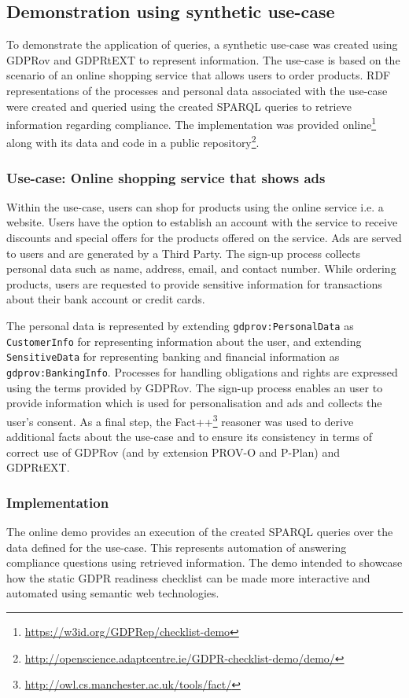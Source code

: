 \subsection{Demonstration using synthetic use-case} \label{sec:testing:sparql:demo}
To demonstrate the application of queries, a synthetic use-case was created using GDPRov and GDPRtEXT to represent information.
The use-case is based on the scenario of an online shopping service that allows users to order products.
RDF representations of the processes and personal data associated with the use-case were created and queried using the created SPARQL queries to retrieve information regarding compliance.
The implementation was provided online\footnote{\url{https://w3id.org/GDPRep/checklist-demo}} along with its data and code in a public repository\footnote{\url{http://openscience.adaptcentre.ie/GDPR-checklist-demo/demo/}}.

\subsubsection{Use-case: Online shopping service that shows ads}
Within the use-case, users can shop for products using the online service i.e. a website. Users have the option to establish an account with the service to receive discounts and special offers for the products offered on the service.
Ads are served to users and are generated by a Third Party.
The sign-up process collects personal data such as name, address, email, and contact number.
While ordering products, users are requested to provide sensitive information for transactions about their bank account or credit cards.

The personal data is represented by extending \texttt{gdprov:PersonalData} as \texttt{CustomerInfo} for representing information about the user, and extending \texttt{SensitiveData} for representing banking and financial information as \texttt{gdprov:BankingInfo}.
Processes for handling obligations and rights are expressed using the terms provided by GDPRov.
The sign-up process enables an user to provide information which is used for personalisation and ads and collects the user's consent.
As a final step, the Fact++\footnote{\url{http://owl.cs.manchester.ac.uk/tools/fact/}}
reasoner was used to derive additional facts about the use-case and to ensure its consistency in terms of correct use of GDPRov (and by extension PROV-O and P-Plan) and GDPRtEXT.

\subsubsection{Implementation}
The online demo provides an execution of the created SPARQL queries over the data defined for the use-case.
This represents automation of answering compliance questions using retrieved information.
The demo intended to showcase how the static GDPR readiness checklist can be made more interactive and automated using semantic web technologies.

